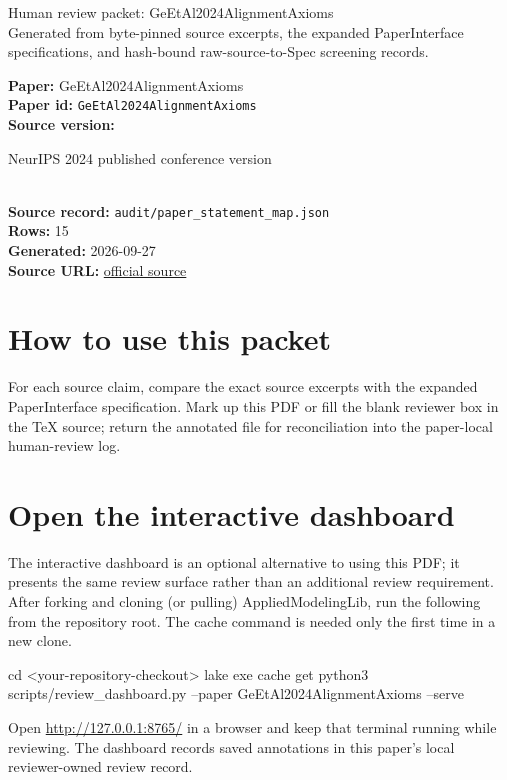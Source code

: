 \documentclass[10pt]{article}
\begin{document}
\fontsize{9}{10}\selectfont

\begin{center}
{\LARGE Human review packet: GeEtAl2024AlignmentAxioms}\\[0.35em]
\small Generated from byte-pinned source excerpts, the expanded PaperInterface
specifications, and hash-bound raw-source-to-Spec screening records.
\end{center}

\noindent\textbf{Paper:} GeEtAl2024AlignmentAxioms\\
\textbf{Paper id:} \texttt{GeEtAl2024AlignmentAxioms}\\
\textbf{Source version:} \parbox[t]{0.76\linewidth}{\raggedright NeurIPS 2024 published conference version}\\
\textbf{Source record:} \texttt{audit/paper\_statement\_map.json}\\
\textbf{Rows:} 15\\
\textbf{Generated:} 2026-09-27\\
\textbf{Source URL:} \href{https://arxiv.org/abs/2405.14758}{official source}





\section*{How to use this packet}
For each source claim, compare the exact source excerpts with the expanded
PaperInterface specification. Mark up this PDF or fill the blank reviewer box in the TeX source;
return the annotated file for reconciliation into the paper-local human-review
log.

\section*{Open the interactive dashboard}
The interactive dashboard is an optional alternative to using this PDF; it
presents the same review surface rather than an additional review requirement.
After forking and cloning (or pulling) AppliedModelingLib, run the following from the
repository root. The cache command is needed only the first time in a new clone.
\begin{ReviewVerbatim}
cd <your-repository-checkout>
lake exe cache get
python3 scripts/review_dashboard.py --paper GeEtAl2024AlignmentAxioms --serve
\end{ReviewVerbatim}
Open \url{http://127.0.0.1:8765/} in a browser and keep that terminal running
while reviewing. The dashboard records saved annotations in this paper's local
reviewer-owned review record.
\end{document}
